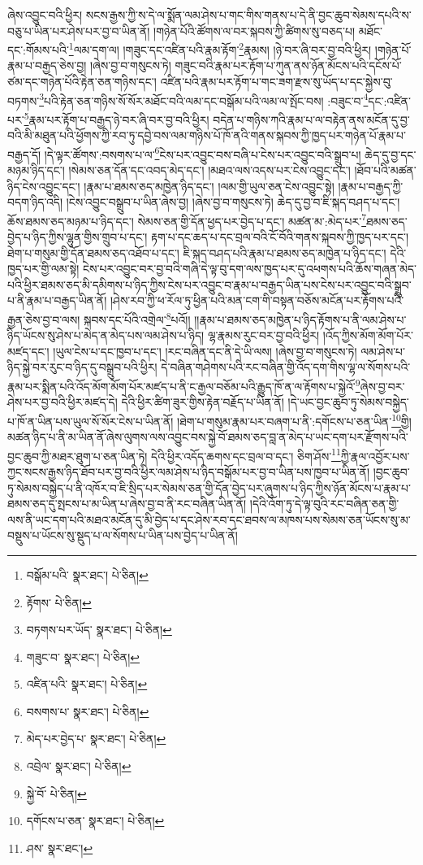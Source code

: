ཞེས་འབྱུང་བའི་ཕྱིར། སངས་རྒྱས་ཀྱི་ས་དེ་ལ་སྨོན་ལམ་ཤེས་པ་གང་གིས་གནས་པ་དེ་ནི་བྱང་ཆུབ་སེམས་དཔའི་ས་བཅུ་པ་ཡིན་པར་ཤེས་པར་བྱ་བ་ཡིན་ནོ། །གཉེན་པོའི་ཚོགས་ལ་བར་སྐབས་ཀྱི་ཚིགས་སུ་བཅད་པ། མཐོང་དང་:གོམས་པའི་\footnote{བསྒོམ་པའི་  སྣར་ཐང་།  པེ་ཅིན། }ལམ་དག་ལ། །གཟུང་དང་འཛིན་པའི་རྣམ་རྟོག་\footnote{རྟོགས་  པེ་ཅིན། }རྣམས། །ཉེ་བར་ཞི་བར་བྱ་བའི་ཕྱིར། །གཉེན་པོ་རྣམ་པ་བརྒྱད་ཅེས་བྱ། །ཞེས་བྱ་བ་གསུངས་ཏེ། གཟུང་བའི་རྣམ་པར་རྟོག་པ་ཀུན་ནས་ཉོན་མོངས་པའི་དངོས་པོ་ཙམ་དང་གཉེན་པོའི་རྟེན་ཅན་གཉིས་དང་། འཛིན་པའི་རྣམ་པར་རྟོག་པ་གང་ཟག་རྫས་སུ་ཡོད་པ་དང་སྐྱེས་བུ་བཏགས་\footnote{བཏགས་པར་ཡོད་  སྣར་ཐང་།  པེ་ཅིན། }པའི་རྟེན་ཅན་གཉིས་སོ་སོར་མཐོང་བའི་ལམ་དང་བསྒོམ་པའི་ལམ་ལ་སྤོང་བས། :བཟུང་བ་\footnote{གཟུང་བ་  སྣར་ཐང་།  པེ་ཅིན། }དང་:འཛིན་པར་\footnote{འཛིན་པའི་  སྣར་ཐང་།  པེ་ཅིན། }རྣམ་པར་རྟོག་པ་བརྒྱད་ཉེ་བར་ཞི་བར་བྱ་བའི་ཕྱིར། བདེན་པ་གཉིས་ཀའི་རྣམ་པ་ལ་བརྟེན་ནས་མངོན་དུ་བྱ་བའི་མི་མཐུན་པའི་ཕྱོགས་ཀྱི་རབ་ཏུ་དབྱེ་བས་ལམ་གཉིས་པོ་ཁོ་ནའི་གནས་སྐབས་ཀྱི་ཁྱད་པར་གཉེན་པོ་རྣམ་པ་བརྒྱད་དོ། །དེ་ལྟར་ཚོགས་:བསགས་པ་ལ་\footnote{བསགས་པ་  སྣར་ཐང་།  པེ་ཅིན། }ངེས་པར་འབྱུང་བས་བཞི་པ་ངེས་པར་འབྱུང་བའི་སྒྲུབ་པ། ཆེད་དུ་བྱ་དང་མཉམ་ཉིད་དང་། །སེམས་ཅན་དོན་དང་འབད་མེད་དང་། །མཐའ་ལས་འདས་པར་ངེས་འབྱུང་དང་། །ཐོབ་པའི་མཚན་ཉིད་ངེས་འབྱུང་དང་། །རྣམ་པ་ཐམས་ཅད་མཁྱེན་ཉིད་དང་། །ལམ་གྱི་ཡུལ་ཅན་ངེས་འབྱུང་སྟེ། །རྣམ་པ་བརྒྱད་ཀྱི་བདག་ཉིད་འདི། །ངེས་འབྱུང་བསྒྲུབ་པ་ཡིན་ཞེས་བྱ། །ཞེས་བྱ་བ་གསུངས་ཏེ། ཆེད་དུ་བྱ་བ་ཇི་སྐད་བཤད་པ་དང་། ཆོས་ཐམས་ཅད་མཉམ་པ་ཉིད་དང་། སེམས་ཅན་གྱི་དོན་ཕྱད་པར་བྱེད་པ་དང་། མཚན་མ་:མེད་པར་\footnote{མེད་པར་བྱེད་པ་  སྣར་ཐང་།  པེ་ཅིན། }ཐམས་ཅད་བྱེད་པ་ཉིད་ཀྱིས་ལྷུན་གྱིས་གྲུབ་པ་དང་། རྟག་པ་དང་ཆད་པ་དང་བྲལ་བའི་ངོ་བོའི་གནས་སྐབས་ཀྱི་ཁྱད་པར་དང་། ཐེག་པ་གསུམ་གྱི་དོན་ཐམས་ཅད་འཐོབ་པ་དང་། ཇི་སྐད་བཤད་པའི་རྣམ་པ་ཐམས་ཅད་མཁྱེན་པ་ཉིད་དང་། དེའི་ཁྱད་པར་གྱི་ལམ་སྟེ། ངེས་པར་འབྱུང་བར་བྱ་བའི་གཞི་དེ་ལྟ་བུ་དག་ལས་ཁྱད་པར་དུ་འཕགས་པའི་ཆོས་གཞན་མེད་པའི་ཕྱིར་ཐམས་ཅད་མི་དམིགས་པ་ཉིད་ཀྱིས་ངེས་པར་འབྱུང་བ་རྣམ་པ་བརྒྱད་ཡིན་པས་ངེས་པར་འབྱུང་བའི་སྒྲུབ་པ་ནི་རྣམ་པ་བརྒྱད་ཡིན་ནོ། །ཤེས་རབ་ཀྱི་ཕ་རོལ་ཏུ་ཕྱིན་པའི་མན་ངག་གི་བསྟན་བཅོས་མངོན་པར་རྟོགས་པའི་རྒྱན་ཅེས་བྱ་བ་ལས། སྐབས་དང་པོའི་འགྲེལ་\footnote{འབྲེལ་  སྣར་ཐང་།  པེ་ཅིན། }པའོ།། །།རྣམ་པ་ཐམས་ཅད་མཁྱེན་པ་ཉིད་རྟོགས་པ་ནི་ལམ་ཤེས་པ་ཉིད་ཡོངས་སུ་ཤེས་པ་མེད་ན་མེད་པས་ལམ་ཤེས་པ་ཉིད། ལྷ་རྣམས་རུང་བར་བྱ་བའི་ཕྱིར། །འོད་ཀྱིས་མོག་མོག་པོར་མཛད་དང་། །ཡུལ་ངེས་པ་དང་ཁྱབ་པ་དང་། །རང་བཞིན་དང་ནི་དེ་ཡི་ལས། །ཞེས་བྱ་བ་གསུངས་ཏེ། ལམ་ཤེས་པ་ཉིད་སྐྱེ་བར་རུང་བ་ཉིད་དུ་བསྒྲུབ་པའི་ཕྱིར། དེ་བཞིན་གཤེགས་པའི་རང་བཞིན་གྱི་འོད་དག་གིས་ལྷ་ལ་སོགས་པའི་རྣམ་པར་སྨིན་པའི་འོད་མོག་མོག་པོར་མཛད་པ་ནི་ང་རྒྱལ་བཅོམ་པའི་རྒྱུད་ཁོ་ན་ལ་རྟོགས་པ་སྐྱེའོ་\footnote{སྐྱེ་བོ་  པེ་ཅིན། }ཞེས་བྱ་བར་ཤེས་པར་བྱ་བའི་ཕྱིར་མཛད་དེ། དེའི་ཕྱིར་ཚིག་ཟུར་གྱིས་རྟེན་བརྗོད་པ་ཡིན་ནོ། །དེ་ཡང་བྱང་ཆུབ་ཏུ་སེམས་བསྐྱེད་པ་ཁོ་ན་ཡིན་པས་ཡུལ་སོ་སོར་ངེས་པ་ཡིན་ནོ། །ཐེག་པ་གསུམ་རྣམ་པར་བཞག་པ་ནི་:དགོངས་པ་ཅན་ཡིན་\footnote{དགོངས་པ་ཅན་  སྣར་ཐང་།  པེ་ཅིན། }གྱི། མཚན་ཉིད་པ་ནི་མ་ཡིན་ནོ་ཞེས་ལུགས་ལས་འབྱུང་བས་སྐྱེ་བོ་ཐམས་ཅད་བླ་ན་མེད་པ་ཡང་དག་པར་རྫོགས་པའི་བྱང་ཆུབ་ཀྱི་མཐར་ཐུག་པ་ཅན་ཡིན་ཏེ། དེའི་ཕྱིར་འདོད་ཆགས་དང་བྲལ་བ་དང་། ཅིག་ཤོས་\footnote{ཤས་  སྣར་ཐང་། }ཀྱི་རྣལ་འབྱོར་པས་ཀྱང་སངས་རྒྱས་ཉིད་ཐོབ་པར་བྱ་བའི་ཕྱིར་ལམ་ཤེས་པ་ཉིད་བསྒོམ་པར་བྱ་བ་ཡིན་པས་ཁྱབ་པ་ཡིན་ནོ། །བྱང་ཆུབ་ཏུ་སེམས་བསྐྱེད་པ་ནི་འཁོར་བ་ཇི་སྲིད་པར་སེམས་ཅན་གྱི་དོན་བྱེད་པར་ཞུགས་པ་ཉིད་ཀྱིས་ཉོན་མོངས་པ་རྣམ་པ་ཐམས་ཅད་དུ་སྤངས་པ་མ་ཡིན་པ་ཞེས་བྱ་བ་ནི་རང་བཞིན་ཡིན་ནོ། །དེའི་འོག་ཏུ་དེ་ལྟ་བུའི་རང་བཞིན་ཅན་གྱི་ལས་ནི་ཡང་དག་པའི་མཐའ་མངོན་དུ་མི་བྱེད་པ་དང་ཤེས་རབ་དང་ཐབས་ལ་མཁས་པས་སེམས་ཅན་ཡོངས་སུ་མ་བསྡུས་པ་ཡོངས་སུ་སྡུད་པ་ལ་སོགས་པ་ཡིན་པས་བྱེད་པ་ཡིན་ནོ། 